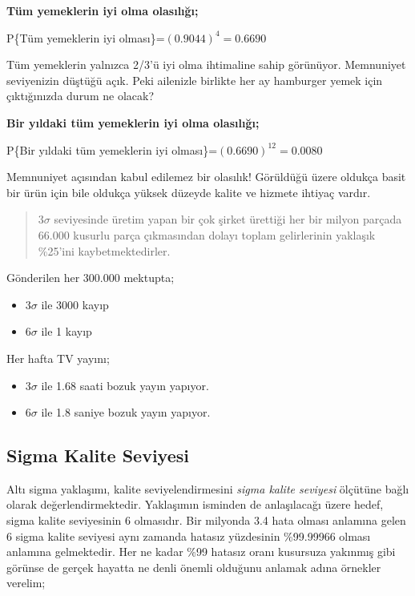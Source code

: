 \documentclass[
]{book}
\providecommand{\tightlist}{%
  \setlength{\itemsep}{0pt}\setlength{\parskip}{0pt}}
\begin{document}
\textbf{Tüm yemeklerin iyi olma olasılığı;}

P\{Tüm yemeklerin iyi olması\}=\((0.9044)^{4}=0.6690\)

Tüm yemeklerin yalnızca 2/3'ü iyi olma ihtimaline sahip görünüyor. Memnuniyet seviyenizin düştüğü açık. Peki ailenizle birlikte her ay hamburger yemek için çıktığınızda durum ne olacak?

\textbf{Bir yıldaki tüm yemeklerin iyi olma olasılığı;}

P\{Bir yıldaki tüm yemeklerin iyi olması\}=\((0.6690)^{12}=0.0080\)

Memnuniyet açısından kabul edilemez bir olasılık! Görüldüğü üzere oldukça basit bir ürün için bile oldukça yüksek düzeyde kalite ve hizmete ihtiyaç vardır.

\begin{quote}
3\(\sigma\) seviyesinde üretim yapan bir çok şirket ürettiği her bir milyon parçada 66.000 kusurlu parça çıkmasından dolayı toplam gelirlerinin yaklaşık \%25'ini kaybetmektedirler.
\end{quote}

Gönderilen her 300.000 mektupta;

\begin{itemize}
\tightlist
\item
  3\(\sigma\) ile 3000 kayıp
\item
  6\(\sigma\) ile 1 kayıp
\end{itemize}

Her hafta TV yayını;

\begin{itemize}
\tightlist
\item
  3\(\sigma\) ile 1.68 saati bozuk yayın yapıyor.
\item
  6\(\sigma\) ile 1.8 saniye bozuk yayın yapıyor.
\end{itemize}

\hypertarget{sigma-kalite-seviyesi}{%
\subsection{Sigma Kalite Seviyesi}\label{sigma-kalite-seviyesi}}

Altı sigma yaklaşımı, kalite seviyelendirmesini \emph{sigma kalite seviyesi} ölçütüne bağlı olarak değerlendirmektedir. Yaklaşımın isminden de anlaşılacağı üzere hedef, sigma kalite seviyesinin 6 olmasıdır. Bir milyonda 3.4 hata olması anlamına gelen 6 sigma kalite seviyesi aynı zamanda hatasız yüzdesinin \%99.99966 olması anlamına gelmektedir. Her ne kadar \%99 hatasız oranı kusursuza yakınmış gibi görünse de gerçek hayatta ne denli önemli olduğunu anlamak adına örnekler verelim;
\end{document}
